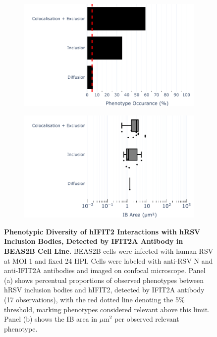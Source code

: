 \begin{figure}
    \begin{subfigure}{0.495\textwidth}
        \caption{}
        \includegraphics[width=1\linewidth]{08. Chapter 3/Figs/02. Infection/02. IFIT2/01. IFIT2A/10. bar_i2a_beas2b.pdf} 
    \end{subfigure}
    \begin{subfigure}{0.495\textwidth}
        \caption{}
        \includegraphics[width=1\linewidth]{08. Chapter 3/Figs/02. Infection/02. IFIT2/01. IFIT2A/11. box_i2a_beas2b.pdf}
    \end{subfigure}
    \caption[Phenotypic Diversity of hIFIT2 Interactions with hRSV Inclusion Bodies, Detected by IFIT2A Antibody in BEAS2B Cell Line.]{\textbf{Phenotypic Diversity of hIFIT2 Interactions with hRSV Inclusion Bodies, Detected by IFIT2A Antibody in BEAS2B Cell Line.} BEAS2B cells were infected with human RSV at MOI 1 and fixed 24 HPI. Cells were labeled with anti-RSV N and anti-IFIT2A antibodies and imaged on confocal microscope. Panel (a) shows percentual proportions of observed phenotypes between hRSV inclusion bodies and hIFIT2, detected by IFIT2A antibody (17 observations), with the red dotted line denoting the 5\% threshold, marking phenotypes considered relevant above this limit. Panel (b) shows the IB area in \(\mu \mbox{m}^2\) per observed relevant phenotype.}
    \label{fig:Phenotypic Diversity of hIFIT2 Interactions with hRSV Inclusion Bodies, Detected by IFIT2A Antibody in BEAS2B Cell Line}
\end{figure}

